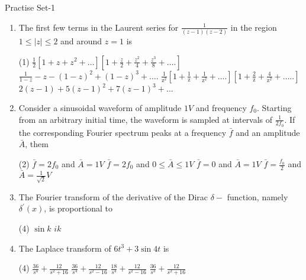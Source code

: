\newpage
\begin{abox}
	Practise Set-1
\end{abox}
\begin{enumerate}[label=\color{ocre}\textbf{\arabic*.}]
	\item   The first few terms in the Laurent series for $\frac{1}{(z-1)(z-2)}$ in the region $1 \leq|z| \leq 2$ and around $z=1$ is
	{}
	\begin{tasks}(1)
		\task[\textbf{A.}] $\frac{1}{2}\left[1+z+z^{2}+\ldots\right]\left[1+\frac{z}{2}+\frac{z^{2}}{4}+\frac{z^{3}}{8}+\ldots .\right]$
		\task[\textbf{B.}] $\frac{1}{1-z}-z-(1-z)^{2}+(1-z)^{3}+\ldots .$
		\task[\textbf{C.}] $\frac{1}{\mathrm{z}^{2}}\left[1+\frac{1}{\mathrm{z}}+\frac{1}{\mathrm{z}^{2}}+\ldots .\right]\left[1+\frac{2}{\mathrm{z}}+\frac{4}{\mathrm{z}^{2}}+\ldots . .\right]$
		\task[\textbf{D.}]  $2(z-1)+5(z-1)^{2}+7(z-1)^{3}+\ldots$
	\end{tasks}
	\item Consider a sinusoidal waveform of amplitude $1 V$ and frequency $f_{0}$. Starting from an arbitrary initial time, the waveform is sampled at intervals of $\frac{1}{2 f_{0}}$. If the corresponding Fourier spectrum peaks at a frequency $\bar{f}$ and an amplitude $\bar{A}$, them
	{}
	\begin{tasks}(2)
		\task[\textbf{A.}] $\bar{f}=2 f_{0}$ and $\bar{A}=1 V$
		\task[\textbf{B.}] $\bar{f}=2 f_{0}$ and $0 \leq \bar{A} \leq 1 V$
		\task[\textbf{C.}] $\bar{f}=0$ and $\bar{A}=1 V$
		\task[\textbf{D.}] $\bar{f}=\frac{f_{0}}{2}$ and $\bar{A}=\frac{1}{\sqrt{2}} V$
	\end{tasks}
	\item The Fourier transform of the derivative of the Dirac $\delta-$ function, namely $\delta^{\prime}(x)$, is proportional to
	{}
	\begin{tasks}(4)
		\task[\textbf{C.}] $\sin k$
		\task[\textbf{D.}] $i k$
	\end{tasks}
	\item The Laplace transform of $6 t^{3}+3 \sin 4 t$ is
	{}
	\begin{tasks}(4)
		\task[\textbf{A.}] $\frac{36}{s^{4}}+\frac{12}{s^{2}+16}$
		\task[\textbf{B.}] $\frac{36}{s^{4}}+\frac{12}{s^{2}-16}$
		\task[\textbf{C.}] $\frac{18}{s^{4}}+\frac{12}{s^{2}-16}$
		\task[\textbf{D.}] $\frac{36}{s^{3}}+\frac{12}{s^{2}+16}$
	\end{tasks}

\end{enumerate}
